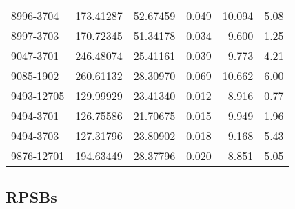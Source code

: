 \begin{table}[]
\begin{tabular}{lrrrrr}
8996-3704 & 173.41287 & 52.67459 & 0.049 & 10.094 & 5.08 \\
8997-3703 & 170.72345 & 51.34178 & 0.034 & 9.600 & 1.25 \\
9047-3701 & 246.48074 & 25.41161 & 0.039 & 9.773 & 4.21 \\
9085-1902 & 260.61132 & 28.30970 & 0.069 & 10.662 & 6.00 \\
9493-12705 & 129.99929 & 23.41340 & 0.012 & 8.916 & 0.77 \\
9494-3701 & 126.75586 & 21.70675 & 0.015 & 9.949 & 1.96 \\
9494-3703 & 127.31796 & 23.80902 & 0.018 & 9.168 & 5.43 \\
9876-12701 & 194.63449 & 28.37796 & 0.020 & 8.851 & 5.05 \\
\hline
\end{tabular}
\end{table}

\subsection{RPSBs}

